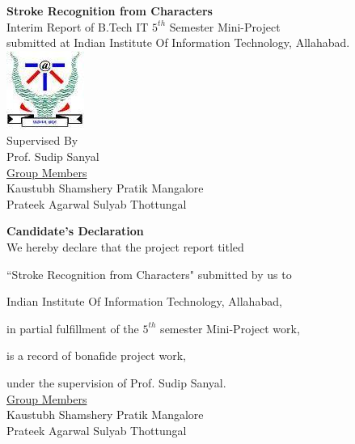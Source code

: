 \documentclass[10pt]{article}
\begin{document}
	\newpage
	\begin{center}
		\Huge \textbf{Stroke Recognition from Characters}
		\\[100pt]
		\Large Interim Report of B.Tech IT $5^{th}$ Semester Mini-Project
		\\submitted at Indian Institute Of Information Technology, Allahabad.\\[20pt]
		\includegraphics{iiita.jpg}
		\\[100pt]
		\Large Supervised By\\Prof. Sudip Sanyal
		\\[100pt]
		\underline{Group Members}
		\\[20pt]
		Kaustubh Shamshery \hspace{40pt} Pratik Mangalore\\Prateek Agarwal \hspace{60pt}Sulyab Thottungal     
	\end{center}
	\large
	\newpage
	\begin{center}
		\Huge \textbf{Candidate's Declaration}
		\\[120pt]
		\Large
		We hereby declare that the project report titled
		
		``Stroke Recognition from Characters" submitted by us to
		
		Indian Institute Of Information Technology, Allahabad,
		
		in partial fulfillment of the $5^{th}$ semester Mini-Project work,
		
		is a record of bonafide project work, 
		
		under the supervision of Prof. Sudip Sanyal.
		\\[100pt]
		\underline{Group Members}
		\\[50pt]
		Kaustubh Shamshery \hspace{40pt} Pratik Mangalore\\[50pt] Prateek Agarwal \hspace{60pt}Sulyab Thottungal
	\end{center}
	\newpage
\end{document}
